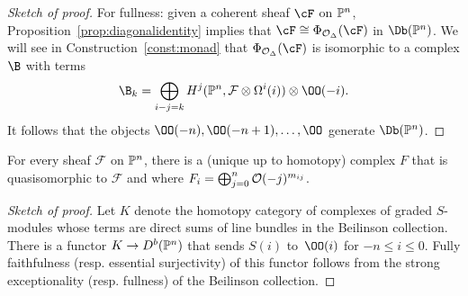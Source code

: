 \documentclass{amsart}
\begin{document}
\begin{proof}[Sketch of proof]
For fullness: given a coherent sheaf $\cF$ on $\mathbb P^n$,  Proposition~\ref{prop:diagonalidentity} implies that $\cF\cong \Phi_{\cO_\Delta}(\cF)$ in $\Db(\PP^n)$. We will see in Construction~\ref{const:monad} that $\Phi_{\cO_\Delta}(\cF)$ is isomorphic to a complex $\B$ with terms
  $$
  \B_k
  = \bigoplus_{i-j=k} H^j(\PP^n, \F \otimes \Omega^i(i)) \otimes\OO(-i).
  $$
  It follows that the objects $\OO(-n), \OO(-n+1), \dots, \OO$ generate $\Db(\PP^n)$.
\end{proof}

\begin{cor}\label{cor:UniquenessAndFSEC}
    For every sheaf $\mathcal F$ on $\mathbb P^n$, there is a (unique up to homotopy) complex $F$ that is quasisomorphic to $\mathcal F$ and where $F_i = \bigoplus_{j=0}^n {\mathcal O}(-j)^{m_{ij}}$.
\end{cor}

\begin{proof}[Sketch of proof]
Let $K$ denote the homotopy category of complexes of graded $S$-modules whose terms are direct sums of line bundles in the Beilinson collection. There is a functor $K \to D^b(\mathbb P^n)$ that sends $S(i)$ to~$\OO(i)$ for $-n \le i \le 0$. Fully faithfulness (resp. essential surjectivity) of this functor follows from the strong exceptionality (resp. fullness) of the Beilinson collection.
\end{proof}
\end{document}
